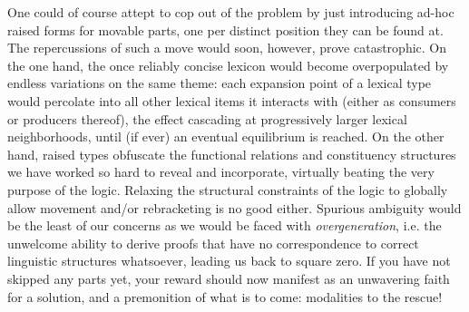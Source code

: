 One could of course attept to cop out of the problem by just introducing ad-hoc raised forms for movable parts, one per distinct position they can be found at. 
The repercussions of such a move would soon, however, prove catastrophic.
On the one hand, the once reliably concise lexicon would become overpopulated by endless variations on the same theme: each expansion point of a lexical type would percolate into all other lexical items it interacts with (either as consumers or producers thereof), the effect cascading at progressively larger lexical neighborhoods, until (if ever) an eventual equilibrium is reached.
On the other hand, raised types obfuscate the functional relations and constituency structures we have worked so hard to reveal and incorporate, virtually beating the very purpose of the logic.
Relaxing the structural constraints of the logic to globally allow movement and/or rebracketing is no good either.
Spurious ambiguity would be the least of our concerns as we would be faced with \textit{overgeneration}, i.e. the unwelcome ability to derive proofs that have no correspondence to correct linguistic structures whatsoever, leading us back to square zero.
If you have not skipped any parts yet, your reward should now manifest as an unwavering faith for a solution, and a premonition of what is to come: modalities to the rescue!

